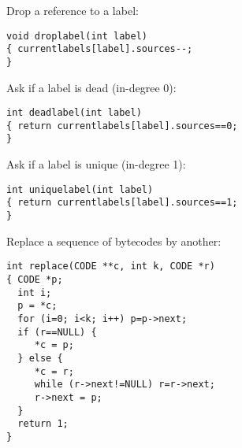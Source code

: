 \begin{slide*}

Drop a reference to a label:

\begin{scriptsize}
\begin{verbatim}
void droplabel(int label)
{ currentlabels[label].sources--;
}
\end{verbatim}
\end{scriptsize}

Ask if a label is dead (in-degree 0):

\begin{scriptsize}
\begin{verbatim}
int deadlabel(int label)
{ return currentlabels[label].sources==0;
}
\end{verbatim}
\end{scriptsize}

Ask if a label is unique (in-degree 1):

\begin{scriptsize}
\begin{verbatim}
int uniquelabel(int label)
{ return currentlabels[label].sources==1;
}
\end{verbatim}
\end{scriptsize}

Replace a sequence of bytecodes by another:

\begin{scriptsize}
\begin{verbatim}
int replace(CODE **c, int k, CODE *r)
{ CODE *p;
  int i;
  p = *c;
  for (i=0; i<k; i++) p=p->next;
  if (r==NULL) {
     *c = p;
  } else {
     *c = r;
     while (r->next!=NULL) r=r->next;
     r->next = p;
  }
  return 1;
}
\end{verbatim}
\end{scriptsize}

\vfil
\end{slide*}
 
